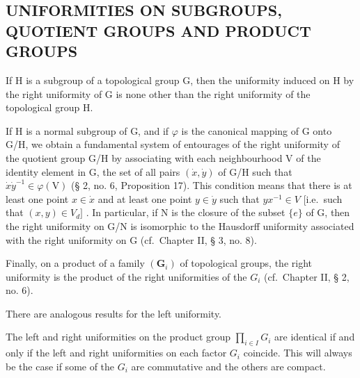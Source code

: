 \subsection{UNIFORMITIES ON SUBGROUPS, QUOTIENT GROUPS AND PRODUCT GROUPS}

If H is a subgroup of a topological group G, then the uniformity induced on H by the right uniformity of G is none other than the right uniformity of the topological group H.

If H is a normal subgroup of G, and if \(\varphi\) is the canonical mapping of G onto G/H, we obtain a fundamental system of entourages of the right uniformity of the quotient group G/H by associating with each neighbourhood V of the identity element in G, the set of all pairs \((\dot{x},\dot{y})\) of G/H such that \(\dot{x}\dot{y}^{-1}\in \varphi (\mathrm{V})\) (§ 2, no. 6, Proposition 17). This condition means that there is at least one point \(x\in \dot{x}\) and at least one point \(y\in \dot{y}\) such that \(yx^{-1}\in V\) {[}i.e.~such that \((x,y)\in V_d]\) . In particular, if N is the closure of the subset \(\{e\}\) of G, then the right uniformity on G/N is isomorphic to the Hausdorff uniformity associated with the right uniformity on G (cf.~Chapter II, § 3, no. 8).

Finally, on a product of a family \((\mathbf{G}_{i})\) of topological groups, the right uniformity is the product of the right uniformities of the \(G_{i}\) (cf.~Chapter II, § 2, no. 6).

There are analogous results for the left uniformity.

The left and right uniformities on the product group \(\prod_{i\in I}G_i\) are identical if and only if the left and right uniformities on each factor \(G_{i}\) coincide. This will always be the case if some of the \(G_{i}\) are commutative and the others are compact.

